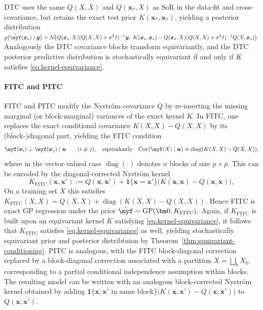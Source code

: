 \documentclass[11pt,a4paper]{article}
\newcommand{\bx}{\boldsymbol{x}}
\newcommand{\by}{\boldsymbol{y}}
\begin{document}
DTC uses the same $Q(X,X)$ and $Q(\bx_\ast,X)$ as SoR in the data-fit and cross-covariance, but retains the exact test prior
$K(\bx_\ast,\bx_\ast)$, yielding a posterior distribution \begin{math}
    p\bigl(\tilde{\myf}(\bx_\ast)\mid \by\bigr)=
\mathcal{N}\!\bigl(Q(\bx_\ast,X)(Q(X,X)+\sigma^2 I)^{-1}\by,\; K(\bx_\ast,\bx_\ast)-Q(\bx_\ast,X)(Q(X,X)+\sigma^2I)^{-1}Q(X,\bx_\ast)\bigr).
\end{math}
Analogously the DTC covariance blocks transform equivariantly, and the DTC posterior predictive distribution is stochastically
equivariant if and only if $K$ satisfies \eqref{eq:kernel-equivariance}.

\paragraph{FITC and PITC}
FITC and PITC modify the Nyström covariance $Q$ by re-inserting the missing marginal (or block-marginal)
variances of the exact kernel $K$. In FITC, one replaces the exact conditional covariance
$K(X,X)-Q(X,X)$ by its (block-)diagonal part, yielding the {FITC condition}
\begin{displaymath}\myf(\bx_i)\perp \myf(\bx_j)\mid \boldsymbol{u} \qquad (i\neq j), \quad\text{equivalently}\quad \mathrm{Cov}(\myf(X)\mid \boldsymbol{u})\approx \operatorname{diag}(K(X,X)-Q(X,X)),\end{displaymath}
where in the vector-valued case $\operatorname{diag}(\cdot)$ denotes $n$ blocks of size $p\times p$.
This can be encoded by the diagonal-corrected Nyström kernel
\begin{displaymath}K_{\mathrm{FITC}}(\bx,\bx') :=Q(\bx,\bx')+\mathbf{1}\{\bx=\bx'\}\big(K(\bx,\bx)-Q(\bx,\bx)\big),\end{displaymath}
On a training set $X$ this satisfies
$K_{\mathrm{FITC}}(X,X)=Q(X,X)+\operatorname{diag}(K(X,X)-Q(X,X))$.
Hence FITC is exact GP regression under the prior $\tilde{\myf}\sim\mathrm{GP}(\bm 0,K_{\mathrm{FITC}}).$ %
Again, if $K_{\mathrm{FITC}}$ is built upon an equivariant kernel $K$ satisfying \eqref{eq:kernel-equivariance}, it follows that $K_{\mathrm{FITC}}$ satisfies \eqref{eq:kernel-equivariance} as well, yielding stochastically equivariant prior and posterior distribtuion by Theorem~\ref{thm:equivariant-conditioning}. PITC is analogous, with the FITC block-diagonal correction replaced by a block-diagonal correction associated with a partition $X=\bigsqcup_b X_b$, corresponding to a {partial} conditional independence assumption within blocks. The resulting model can be written with an analogous block-corrected Nyström kernel obtained by adding $\mathbf{1}\{\bx,\bx'\text{ in same block}\}\big(K(\bx,\bx')-Q(\bx,\bx')\big)$ to $Q(\bx,\bx')$.
\end{document}
